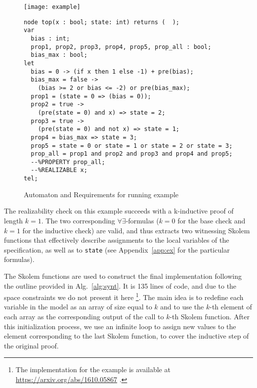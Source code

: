 \begin{figure}[tb]
\begin{minipage}[c]{0.35\textwidth}
\centering
\texttt{[image: example]}
\end{minipage}
\begin{minipage}[c]{0.7\textwidth}
 \begin{Verbatim}[fontsize=\scriptsize]
node top(x : bool; state: int) returns (  );
var
  bias : int;
  prop1, prop2, prop3, prop4, prop5, prop_all : bool;
  bias_max : bool;
let
  bias = 0 -> (if x then 1 else -1) + pre(bias);
  bias_max = false ->
	(bias >= 2 or bias <= -2) or pre(bias_max);
  prop1 = (state = 0 => (bias = 0));
  prop2 = true ->
  	(pre(state = 0) and x) => state = 2;
  prop3 = true ->
  	(pre(state = 0) and not x) => state = 1;
  prop4 = bias_max => state = 3;
  prop5 = state = 0 or state = 1 or state = 2 or state = 3;
  prop_all = prop1 and prop2 and prop3 and prop4 and prop5;
  --%PROPERTY prop_all;
  --%REALIZABLE x;
tel;
 \end{Verbatim}
\end{minipage}
\caption{Automaton and Requirements for running example}
\label{fg:example}
\end{figure}

The realizability check on this example succeeds with a k-inductive
proof of length $k = 1$. The two corresponding
$\forall\exists$-formulas ($k=0$ for the base check and $k=1$ for the
inductive check) are valid, and thus \aeval extracts two witnessing
Skolem functions that effectively describe assignments to the local
variables of the specification, as well as to \texttt{state} (see
Appendix~\ref{app:ex} for the particular formulas).

The Skolem functions are used to construct the final implementation
following the outline provided in Alg.~\ref{alg:synt}.
It is 135 lines of code, and due to the space constraints we do not
present it here%
\footnote{The implementation for the
example is available at \url{https://arxiv.org/abs/1610.05867} .}.
The main idea is to redefine each variable in the model
as an array of size equal to $k$ and
to use the $k$-th element of each array as the corresponding output of the call
to $k$-th Skolem function. After this initialization process, we use an infinite
loop to assign new values to the element corresponding to the last Skolem
function, to cover the inductive step of the original proof.

